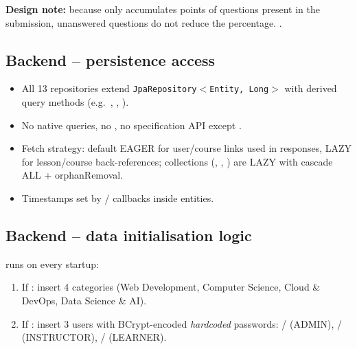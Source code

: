 \noindent \textbf{Design note:} because  only accumulates points of questions present in the submission, unanswered questions do not reduce the percentage. .

\subsection{Backend -- persistence access}

\begin{itemize}
    \item All 13 repositories extend \texttt{JpaRepository$<$Entity, Long$>$} with derived query methods (e.g.\ , , ).
    \item No native queries, no , no specification API except .
    \item Fetch strategy:  default EAGER for user/course links used in responses, LAZY for lesson/course back-references; collections (, , ) are LAZY with cascade ALL + orphanRemoval.
    \item Timestamps set by / callbacks inside entities.
\end{itemize}

\subsection{Backend -- data initialisation logic}

 runs on every startup:
\begin{enumerate}
    \item If : insert 4 categories (Web Development, Computer Science, Cloud \& DevOps, Data Science \& AI).
    \item If : insert 3 users with BCrypt-encoded \emph{hardcoded} passwords: / (ADMIN), / (INSTRUCTOR), / (LEARNER).
\end{enumerate}

